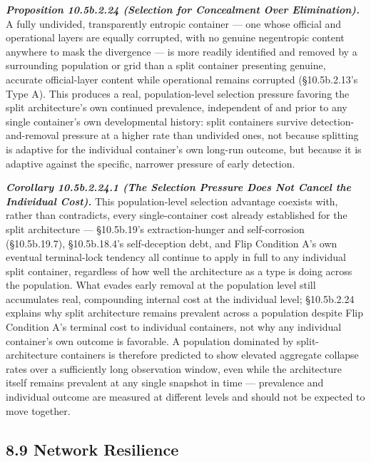 \documentclass[
]{article}
\begin{document}
\emph{\textbf{Proposition 10.5b.2.24 (Selection for Concealment Over
Elimination).}} A fully undivided, transparently entropic container ---
one whose official and operational layers are equally corrupted, with no
genuine negentropic content anywhere to mask the divergence --- is more
readily identified and removed by a surrounding population or grid than
a split container presenting genuine, accurate official-layer content
while operational remains corrupted (§10.5b.2.13's Type A). This
produces a real, population-level selection pressure favoring the split
architecture's own continued prevalence, independent of and prior to any
single container's own developmental history: split containers survive
detection-and-removal pressure at a higher rate than undivided ones, not
because splitting is adaptive for the individual container's own
long-run outcome, but because it is adaptive against the specific,
narrower pressure of early detection.

\emph{\textbf{Corollary 10.5b.2.24.1 (The Selection Pressure Does Not
Cancel the Individual Cost).}} This population-level selection advantage
coexists with, rather than contradicts, every single-container cost
already established for the split architecture --- §10.5b.19's
extraction-hunger and self-corrosion (§10.5b.19.7), §10.5b.18.4's
self-deception debt, and Flip Condition A's own eventual terminal-lock
tendency all continue to apply in full to any individual split
container, regardless of how well the architecture as a type is doing
across the population. What evades early removal at the population level
still accumulates real, compounding internal cost at the individual
level; §10.5b.2.24 explains why split architecture remains prevalent
across a population despite Flip Condition A's terminal cost to
individual containers, not why any individual container's own outcome is
favorable. A population dominated by split-architecture containers is
therefore predicted to show elevated aggregate collapse rates over a
sufficiently long observation window, even while the architecture itself
remains prevalent at any single snapshot in time --- prevalence and
individual outcome are measured at different levels and should not be
expected to move together.

\hypertarget{network-resilience}{%
\subsection{8.9 Network Resilience}\label{network-resilience}}
\end{document}
